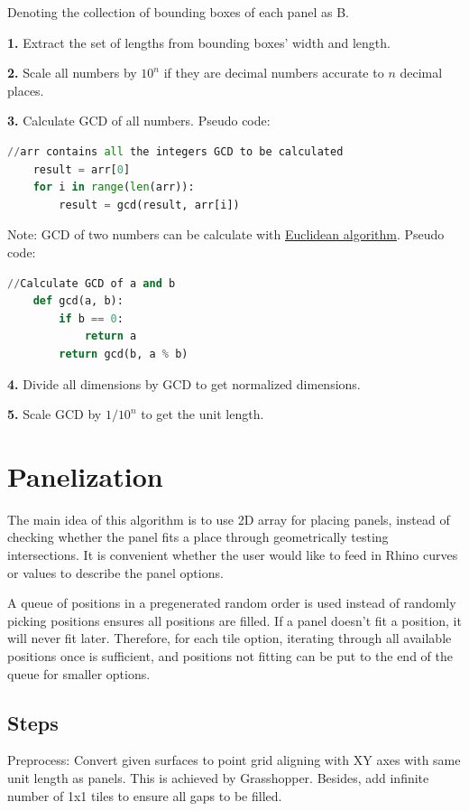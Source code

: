 \documentclass{article}
\begin{document}
Denoting the collection of bounding boxes of each panel as B.

\textbf{1.} Extract the set of lengths from bounding boxes' width and length.

\textbf{2.} Scale all numbers by $10^n$ if they are decimal numbers accurate to $n$ decimal places.

\textbf{3.} Calculate GCD of all numbers. Pseudo code:

\begin{lstlisting}[language=Python]
	//arr contains all the integers GCD to be calculated
	result = arr[0]
	for i in range(len(arr)):
		result = gcd(result, arr[i])
\end{lstlisting}

Note: GCD of two numbers can be calculate with \href{https://en.wikipedia.org/wiki/Euclidean_algorithm}{Euclidean algorithm}. Pseudo code:

\begin{lstlisting}[language=Python]
	//Calculate GCD of a and b
	def gcd(a, b):
		if b == 0:
			return a
		return gcd(b, a % b)
\end{lstlisting}

\textbf{4.} Divide all dimensions by GCD to get normalized dimensions.

\textbf{5.} Scale GCD by $1/10^n$ to get the unit length.

\section{Panelization}

The main idea of this algorithm is to use 2D array for placing panels, instead of checking whether the panel fits a place through geometrically testing intersections. It is convenient whether the user would like to feed in Rhino curves or values to describe the panel options.

A queue of positions in a pregenerated random order is used instead of randomly picking positions ensures all positions are filled. If a panel doesn't fit a position, it will never fit later. Therefore, for each tile option, iterating through all available positions once is sufficient, and positions not fitting can be put to the end of the queue for smaller options.

\subsection{Steps}

Preprocess: Convert given surfaces to point grid aligning with XY axes with same unit length as panels. This is achieved by Grasshopper. Besides, add infinite number of 1x1 tiles to ensure all gaps to be filled.
\end{document}
